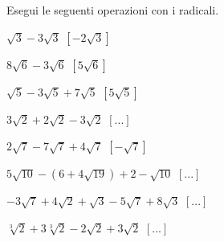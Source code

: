 \begin{esercizio}[*]
\label{ese:2.50}
Esegui le seguenti operazioni con i radicali.
\begin{htmulticols}{2}
\begin{enumeratea}
\item \(\sqrt 3-3\sqrt 3\)
\hfill \(\left[-2 \sqrt{3}\right]\)
\item \(8\sqrt 6-3\sqrt 6\)
\hfill \(\left[5\sqrt 6\right]\)
\item \(\sqrt 5-3\sqrt 5+7\sqrt 5\)
\hfill \(\left[5 \sqrt{5}\right]\)
\item \(3\sqrt 2+2\sqrt 2-3\sqrt 2\)
\hfill \(\left[...\right]\)
\item \(2\sqrt 7-7\sqrt 7+4\sqrt 7\)
\hfill \(\left[-\sqrt 7\right]\)
\item \(5\sqrt{10}-\left(6+4\sqrt{19}\right)+2-\sqrt{10}\)
\hfill \(\left[...\right]\)
\item \(-3\sqrt 7+4\sqrt 2+\sqrt 3-5\sqrt 7+8\sqrt 3\)
\hfill \(\left[...\right]\)
\item \(\sqrt[3]2+3\sqrt[3]2-2\sqrt 2+3\sqrt 2\)
\hfill \(\left[...\right]\)
\end{enumeratea}
\end{htmulticols}
\end{esercizio}

